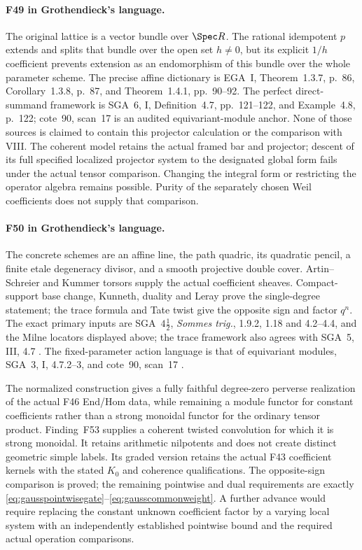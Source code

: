 \documentclass[11pt,a4paper]{article}
\newcommand{\fid}[1]{\textsf{#1}}\newcommand{\gate}[1]{\textsf{#1}}
\theoremstyle{named}\newtheorem{finding}{Finding}[section]
\theoremstyle{definition}\newtheorem{definition}[finding]{Definition}
\theoremstyle{remark}\newtheorem{remark}[finding]{Remark}
\begin{document}
\paragraph{\fid{F49} in Grothendieck's language.}
The original lattice is a vector bundle over $\Spec R$.
The rational idempotent $p$ extends and splits that bundle
over the open set $h\ne0$, but its explicit $1/h$ coefficient
prevents extension as an endomorphism of this bundle over
the whole parameter scheme. The precise affine dictionary is
EGA~I, Theorem~1.3.7, p.~86, Corollary~1.3.8, p.~87, and
Theorem~1.4.1, pp.~90--92.
The perfect direct-summand framework is SGA~6, I,
Definition~4.7, pp.~121--122, and Example~4.8, p.~122;
cote~90, scan~17 is an audited equivariant-module anchor.
None of those sources is claimed to contain this projector
calculation or the comparison with VIII.
The coherent model retains the actual framed bar and projector;
descent of its full specified localized projector system to
the designated global form fails under the actual tensor
comparison. Changing the integral form or restricting the
operator algebra remains possible. Purity of the separately
chosen Weil coefficients does not supply that comparison.


\paragraph{\fid{F50} in Grothendieck's language.}
The concrete schemes are an affine line, the path quadric,
its quadratic pencil, a finite etale degeneracy divisor,
and a smooth projective double cover. Artin--Schreier
and Kummer torsors supply the actual coefficient sheaves.
Compact-support base change, Kunneth, duality and Leray
prove the single-degree statement; the trace formula and
Tate twist give the opposite sign and factor $q^n$.
The exact primary inputs are SGA~$4\frac12$,
\emph{Sommes trig.}, 1.9.2, 1.18 and 4.2--4.4, and
the Milne locators displayed above; the trace framework
also agrees with SGA~5, III, 4.7 \cite{SGA45,Milne,SGA5}.
The fixed-parameter action language is that of equivariant
modules, SGA~3, I, 4.7.2--3, and cote~90, scan~17
\cite{SGA3,Archive}.

The normalized construction gives a fully faithful
degree-zero perverse realization of the actual
\fid{F46} End/Hom data, while remaining a module functor
for constant coefficients rather than a strong monoidal
functor for the ordinary tensor product. Finding~\fid{F53}
supplies a coherent twisted convolution for which it is strong monoidal. It retains arithmetic nilpotents and does not
create distinct geometric simple labels. Its graded
version retains the actual \fid{F43} coefficient kernels
with the stated $K_0$ and coherence qualifications.
The opposite-sign comparison is proved; the remaining
pointwise and dual requirements are exactly
\eqref{eq:gausspointwisegate}--\eqref{eq:gausscommonweight}.
A further advance would require replacing the constant
unknown coefficient factor by a varying local system
with an independently established pointwise bound and
the required actual operation comparisons.
\end{document}

